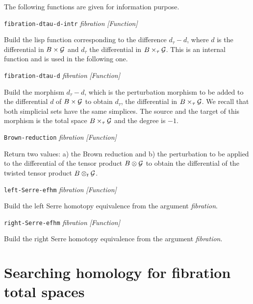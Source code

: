 The following functions are given for information purpose.
\vskip 0.35cm
{\parindent=0mm
{\leftskip=5mm
{\tt fibration-dtau-d-intr} {\em fibration}  \hfill {\em [Function]} \par}
{\leftskip=15mm
Build the lisp function corresponding to the difference $d_\tau - d$, where $d$ is the differential
in $B \times {\cal G}$ and $d_\tau$ the differential in $B \times_\tau {\cal G}$. This is an internal
function and is used in the following one. \par}
{\leftskip=5mm
{\tt fibration-dtau-d} {\em fibration}  \hfill {\em [Function]} \par}
{\leftskip=15mm
Build the morphism $d_\tau-d$, which is the perturbation morphism to be added to
the differential  $d$ of $B \times {\cal G}$  to obtain  $d_\tau$, 
the differential in $B \times_\tau {\cal G}$. We recall that both simplicial sets have
the same simplices. The source and the target of this morphism is the total space
$B \times_\tau {\cal G}$ and the degree is $-1$. \par}
{\leftskip=5mm
{\tt Brown-reduction} {\em fibration}  \hfill {\em [Function]} \par}
{\leftskip=15mm
Return two values: a) the Brown reduction and b) the  perturbation to be applied to the differential of the tensor
product $B \otimes {\cal G}$  to obtain the differential of the twisted tensor
product $B \otimes_t {\cal G}$. \par}
{\leftskip=5mm
{\tt left-Serre-efhm} {\em fibration}  \hfill {\em [Function]} \par}
{\leftskip=15mm
Build the left Serre homotopy equivalence from the argument {\em fibration}. \par}
{\leftskip=5mm
{\tt right-Serre-efhm} {\em fibration}  \hfill {\em [Function]} \par}
{\leftskip=15mm
Build the right Serre homotopy equivalence from the argument {\em fibration}. \par}
}

\section {Searching homology for fibration total spaces}

